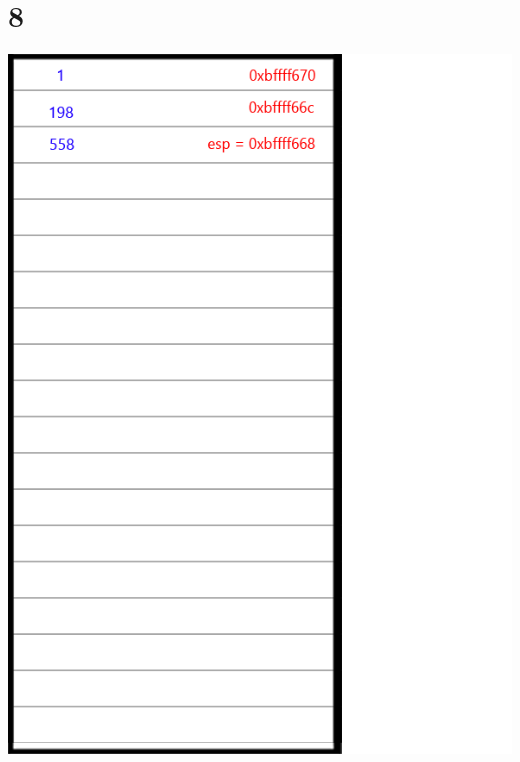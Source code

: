 \documentclass{article}
\begin{document}
\section*{8}
\begin{minipage}{5cm}
\includegraphics[scale=0.3]{s3.png}
\end{minipage}
\end{document}
